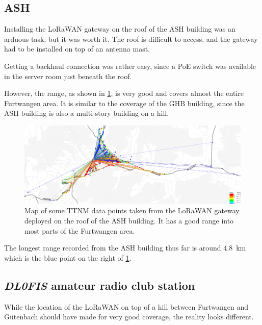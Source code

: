 \subsection{\acf{ASH}}

Installing the \ac{LoRaWAN} gateway on the roof of the \ac{ASH} building was an arduous task, but it was worth it.
The roof is difficult to access, and the gateway had to be installed on top of an antenna mast.

Getting a backhaul connection was rather easy, since a \ac{PoE} switch was available in the server room just beneath the roof.

However, the range, as shown in \cref{pic:ash_gw_range}, is very good and covers almost the entire Furtwangen area.
It is similar to the coverage of the \ac{GHB} building, since the \ac{ASH} building is also a multi-story building on a hill.

\begin{figure}[htbp]
    \centering
    \includegraphics[width=1\textwidth]{pictures/ttn-mapper/gateway-ranges/ash_gw_range.jpg}
    \caption{
        Map of some \ac{TTNM} data points taken from the \ac{LoRaWAN} gateway deployed on the roof of the \ac{ASH} building.
        It has a good range into most parts of the Furtwangen area.
    }\label{pic:ash_gw_range}
\end{figure}

The longest range recorded from the \ac{ASH} building thus far is around \SI{4.8}{\kilo\meter} which is the blue point on the right of \cref{pic:ash_gw_range}.

\subsection{\emph{DL0FIS} amateur radio club station}

While the location of the \ac{LoRaWAN} on top of a hill between Furtwangen and Gütenbach should have made for very good coverage, the reality looks different.

